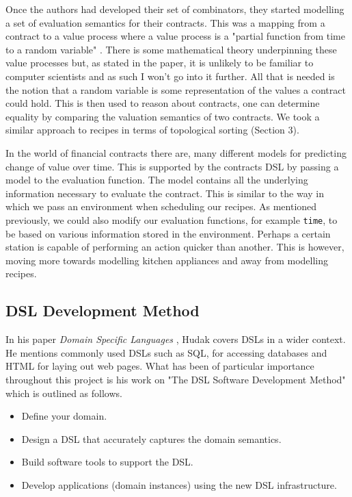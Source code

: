\documentclass[11pt]{article}
\begin{document}
\medbreak

Once the authors had developed their set of combinators, they started modelling
a set of evaluation semantics for their contracts. This was a mapping from
a contract to a value process where a value process is a "partial function
from time to a random variable" \cite{contracts}. There is some mathematical
theory underpinning these value processes but, as stated in the paper, it is
unlikely to be familiar to computer scientists and as such I won't go into it
further. All that is needed is the notion that a random variable is some representation
of the values a contract could hold. This is then used to reason about contracts,
one can determine equality by comparing the valuation semantics of two contracts.
We took a similar approach to recipes in terms of topological sorting (Section 3).

\medbreak

In the world of financial contracts there are, many different models for predicting
change of value over time. This is supported by the contracts DSL by passing a 
model to the evaluation function. The model contains all the underlying information
necessary to evaluate the contract. This is similar to the way in which we pass
an environment when scheduling our recipes. As mentioned previously, we could
also modify our evaluation functions, for example \texttt{time}, to be based
on various information stored in the environment. Perhaps a certain station is
capable of performing an action quicker than another. This is however, moving more
towards modelling kitchen appliances and away from modelling recipes.

\subsection{DSL Development Method}

In his paper \textit{Domain Specific Languages} \cite{hudak}, Hudak covers DSLs
in a wider context. He mentions commonly used DSLs such as SQL, for accessing
databases and HTML for laying out web pages. What has been of particular importance
throughout this project is his work on "The DSL Software Development Method" which
is outlined as follows.

\begin{itemize}
    \item Define your domain.
    \item Design a DSL that accurately captures the domain semantics.
    \item Build software tools to support the DSL.
    \item Develop applications (domain instances) using the new DSL
    infrastructure.
\end{itemize}
\end{document}
